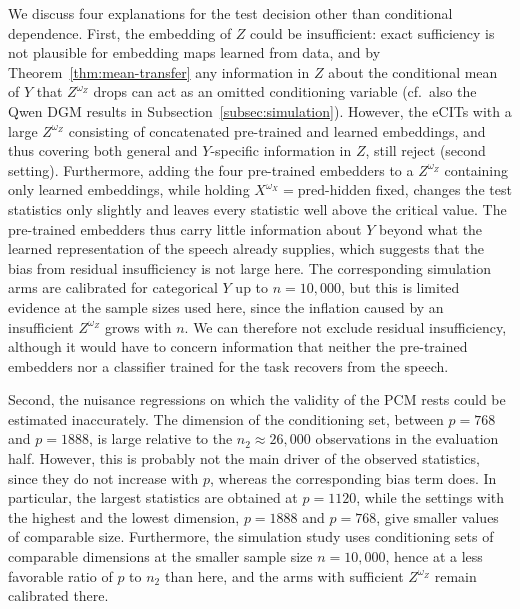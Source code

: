\documentclass[twoside,11pt]{article}
\begin{document}
We discuss four explanations for the test decision other than conditional dependence.
First,  the embedding of $Z$ could be insufficient: exact sufficiency is not plausible for embedding maps learned from data, and by Theorem~\ref{thm:mean-transfer} any information in $Z$ about the conditional mean of $Y$ that $Z^{\omega_Z}$ drops can act as an omitted conditioning variable (cf.\ also the Qwen DGM results in Subsection~\ref{subsec:simulation}).
However, the eCITs with a large $Z^{\omega_Z}$ consisting of concatenated pre-trained and learned embeddings, and thus covering both general and $Y$-specific information in $Z$, still reject (second setting).
Furthermore, adding the four pre-trained embedders to a $Z^{\omega_Z}$ containing only learned embeddings, while holding $X^{\omega_X} = \text{pred-hidden}$ fixed, changes the test statistics only slightly and leaves every statistic well above the critical value.
The pre-trained embedders thus carry little information about $Y$ beyond what the learned representation of the speech already supplies, which suggests that the bias from residual insufficiency is not large here.
The corresponding simulation arms are calibrated for categorical $Y$ up to $n = 10{,}000$, but this is limited evidence at the sample sizes used here, since the inflation caused by an insufficient $Z^{\omega_Z}$ grows with $n$.
We can therefore not exclude residual insufficiency, although it would have to concern information that neither the pre-trained embedders nor a classifier trained for the task recovers from the speech.

Second, the nuisance regressions on which the validity of the PCM rests could be estimated inaccurately.
The dimension of the conditioning set, between $p = 768$ and $p = 1888$, is large relative to the $n_2 \approx 26{,}000$ observations in the evaluation half.
However, this is probably not the main driver of the observed statistics, since they do not increase with $p$, whereas the corresponding bias term does.
In particular, the largest statistics are obtained at $p = 1120$, while the settings with the highest and the lowest dimension, $p = 1888$ and $p = 768$, give smaller values of comparable size.
Furthermore, the simulation study uses conditioning sets of comparable dimensions at the smaller sample size $n = 10{,}000$, hence at a less favorable ratio of $p$ to $n_2$ than here, and the arms with sufficient $Z^{\omega_Z}$ remain calibrated there.
\end{document}
